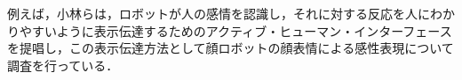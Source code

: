 例えば，小林らは，ロボットが人の感情を認識し，それに対する反応を人にわかりやすいように表示伝達するためのアクティブ・ヒューマン・インターフェースを提唱し，この表示伝達方法として顔ロボットの顔表情による感性表現について調査を行っている\cite{gengo}．






\vspace{1cm}
\begin{figure}[!h]
 \begin{center}
  \centering
  \label{fig:kansei}
 \end{center}
\end{figure}

